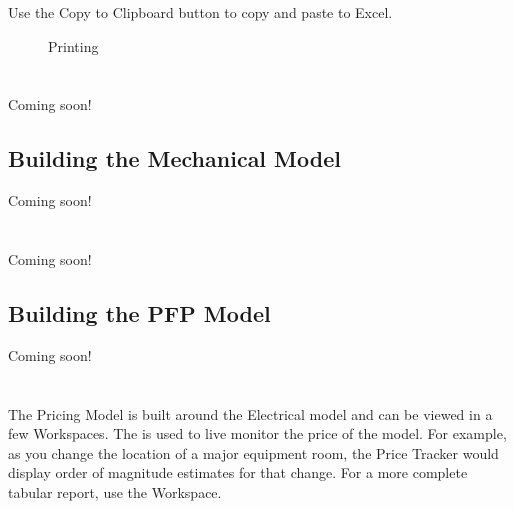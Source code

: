 \documentclass[letterpaper,10pt,english]{sphinxmanual}
\begin{document}
Use the Copy to Clipboard button to copy and paste to Excel.

\begin{figure}[H]
\centering
\capstart

\noindent{}
\caption{Printing}\label{\detokenize{docs/userguide/buildingelectricalmodel/studies/index-studies:id8}}\end{figure}


\section{}
\label{\detokenize{docs/userguide/index-user_guide:building-the-mechanical-model}}
Coming soon!


\subsection{Building the Mechanical Model}
\label{\detokenize{docs/userguide/buildingmechanicalmodel/index-building_mechanical_model:building-the-mechanical-model}}\label{\detokenize{docs/userguide/buildingmechanicalmodel/index-building_mechanical_model:id1}}\label{\detokenize{docs/userguide/buildingmechanicalmodel/index-building_mechanical_model::doc}}
Coming soon!


\section{}
\label{\detokenize{docs/userguide/index-user_guide:building-the-plumbing-and-fire-protection-model}}
Coming soon!


\subsection{Building the PFP Model}
\label{\detokenize{docs/userguide/buildingpfpmodel/index-building_pfp_model:building-the-pfp-model}}\label{\detokenize{docs/userguide/buildingpfpmodel/index-building_pfp_model:id1}}\label{\detokenize{docs/userguide/buildingpfpmodel/index-building_pfp_model::doc}}
Coming soon!


\section{}
\label{\detokenize{docs/userguide/index-user_guide:pricing-model}}\label{\detokenize{docs/userguide/index-user_guide:id8}}
The Pricing Model is built around the Electrical model and can be viewed in a few Workspaces.  The {\hyperref[\detokenize{docs/userguide/pricingmodel/pricetracker/index-price_tracker:price-tracker}]{}} is used to live monitor the price of the model.  For example, as you change the location of a major equipment room, the Price Tracker would display order of magnitude estimates for that change.  For a more complete tabular report, use the {\hyperref[\detokenize{docs/userguide/pricingmodel/pricingreport/index-pricing_report:pricing-report}]{}} Workspace.
\end{document}
